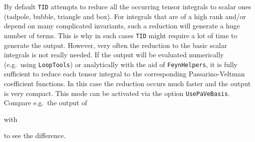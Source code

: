 \documentclass[../FeynCalcManual.tex]{subfiles}
\begin{document}
By default \texttt{TID} attempts to reduce all the occurring tensor
integrals to scalar ones (tadpole, bubble, triangle and box). For
integrals that are of a high rank and/or depend on many complicated
invariants, such a reduction will generate a huge number of terms. This
is why in such cases \texttt{TID} might require a lot of time to
generate the output. However, very often the reduction to the basic
scalar integrals is not really needed. If the output will be evaluated
numerically (e.g.~using \texttt{LoopTools}) or analytically with the aid
of \texttt{FeynHelpers}, it is fully sufficient to reduce each tensor
integral to the corresponding Passarino-Veltman coefficient functions.
In this case the reduction occurs much faster and the output is very
compact. This mode can be activated via the option
\texttt{UsePaVeBasis}. Compare e.g.~the output of

\begin{Shaded}
\begin{Highlighting}[]
\OperatorTok{[}\OperatorTok{[}\OperatorTok{,}\OperatorTok{]}\OperatorTok{[}\OperatorTok{,}\OperatorTok{]}\OperatorTok{[\{}\OperatorTok{,}\OperatorTok{\},} \OperatorTok{\{} \SpecialCharTok{+}\OperatorTok{,}\OperatorTok{\},} \OperatorTok{\{} \SpecialCharTok{+}\OperatorTok{,}\OperatorTok{\}],} \OperatorTok{]}
\end{Highlighting}
\end{Shaded}

with

\begin{Shaded}
\begin{Highlighting}[]
\OperatorTok{[}\OperatorTok{[}\OperatorTok{,}\OperatorTok{]}\OperatorTok{[}\OperatorTok{,}\OperatorTok{]}\OperatorTok{[\{}\OperatorTok{,}\OperatorTok{\},} \OperatorTok{\{} \SpecialCharTok{+}\OperatorTok{,}\OperatorTok{\},} \OperatorTok{\{} \SpecialCharTok{+}\OperatorTok{,}\OperatorTok{\}],} \OperatorTok{,}
\OtherTok{{-}\textgreater{}} \OperatorTok{]}
\end{Highlighting}
\end{Shaded}

to see the difference.
\end{document}
